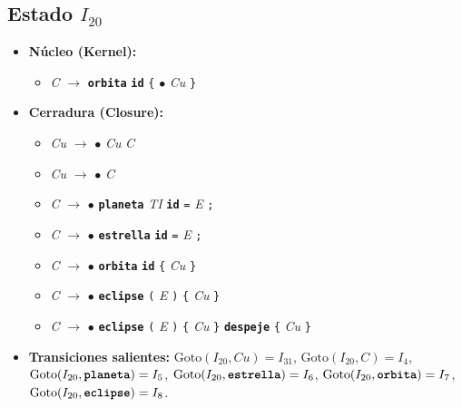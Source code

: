 \documentclass[12pt, letterpaper]{article}
\begin{document}
\subsection*{Estado $I_{20}$ }
\begin{itemize}\setlength{\itemsep}{1pt}\setlength{\parskip}{0pt}
\item \textbf{Núcleo (Kernel):}
\begin{itemize}\setlength{\itemsep}{1pt}\setlength{\parskip}{0pt}
    \item \textit{C} $\to$ \textbf{\texttt{orbita}} \textbf{\texttt{id}} \texttt{\{} $\bullet$ \textit{Cu} \texttt{\}}
\end{itemize}
\item \textbf{Cerradura (Closure):}
\begin{itemize}\setlength{\itemsep}{1pt}\setlength{\parskip}{0pt}
    \item \textit{Cu} $\to$ $\bullet$ \textit{Cu} \textit{C}
    \item \textit{Cu} $\to$ $\bullet$ \textit{C}
    \item \textit{C} $\to$ $\bullet$ \textbf{\texttt{planeta}} \textit{TI} \textbf{\texttt{id}} \texttt{=} \textit{E} \texttt{;}
    \item \textit{C} $\to$ $\bullet$ \textbf{\texttt{estrella}} \textbf{\texttt{id}} \texttt{=} \textit{E} \texttt{;}
    \item \textit{C} $\to$ $\bullet$ \textbf{\texttt{orbita}} \textbf{\texttt{id}} \texttt{\{} \textit{Cu} \texttt{\}}
    \item \textit{C} $\to$ $\bullet$ \textbf{\texttt{eclipse}} \texttt{(} \textit{E} \texttt{)} \texttt{\{} \textit{Cu} \texttt{\}}
    \item \textit{C} $\to$ $\bullet$ \textbf{\texttt{eclipse}} \texttt{(} \textit{E} \texttt{)} \texttt{\{} \textit{Cu} \texttt{\}} \textbf{\texttt{despeje}} \texttt{\{} \textit{Cu} \texttt{\}}
\end{itemize}
\item \textbf{Transiciones salientes:} $\text{Goto}(I_{20}, \textit{Cu}) = I_{31}$, \quad $\text{Goto}(I_{20}, \textit{C}) = I_{4}$, \quad $\text{Goto}(I_{20}, \textbf{\texttt{planeta}}) = I_{5}$, \quad $\text{Goto}(I_{20}, \textbf{\texttt{estrella}}) = I_{6}$, \quad $\text{Goto}(I_{20}, \textbf{\texttt{orbita}}) = I_{7}$, \quad $\text{Goto}(I_{20}, \textbf{\texttt{eclipse}}) = I_{8}$.
\end{itemize}
\vspace{2pt}
\end{document}
